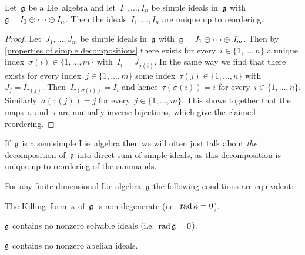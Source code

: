 \begin{corollary}
  \label{uniqueness of semisimple decomposition}
  Let~$\mathfrak{g}$ be a Lie~algebra and let~$I_1, \dotsc, I_n$ be simple ideals in~$\mathfrak{g}$ with~$\mathfrak{g} = I_1 \oplus \dotsb \oplus I_n$.
  Then the ideals~$I_1, \dotsc, I_n$ are unique up to reordering.
\end{corollary}


\begin{proof}
  Let~$J_1, \dotsc, J_m$ be simple ideals in~$\mathfrak{g}$ with~$\mathfrak{g} = J_1 \oplus \dotsb \oplus J_m$.
  Then by \cref{properties of simple decompositions} there exists for every~$i \in \{1, \dotsc, n\}$ a unique index~$\sigma(i) \in \{1, \dotsc, m\}$ with~$I_i = J_{\sigma(i)}$.
  In the same way we find that there exists for every index~$j \in \{1, \dotsc, m\}$ some index~$\tau(j) \in \{1, \dotsc, n\}$ with~$J_j = I_{\tau(j)}$.
  Then~$I_{\tau(\sigma(i))} = I_i$ and hence~$\tau(\sigma(i)) = i$ for every~$i \in \{1, \dotsc, n\}$.
  Similarly~$\sigma(\tau(j)) = j$ for every~$j \in \{1, \dotsc, m\}$.
  This shows together that the maps~$\sigma$ and~$\tau$ are mutually inverse bijections, which give the claimed reordering.
\end{proof}
 
 
\begin{remark}
  If~$\mathfrak{g}$ is a semisimple Lie~algebra then we will often just talk about \emph{the} decomposition of~$\mathfrak{g}$ into  direct sum of simple ideals, as this decomposition is unique up to reordering of the summands.
\end{remark}


\begin{proposition}
  \label{characterisation of zero radical}
  For any finite dimensional Lie algebra~$\mathfrak{g}$ the following conditions are equivalent:
  \begin{equivalenceslist}
    \item
      \label{killing form is nondegenerate}
      The Killing~form~$\kappa$ of~$\mathfrak{g}$ is non-degenerate (i.e.~$\operatorname{rad} \kappa = 0$).
    \item
      \label{contains no solvable ideal}
      $\mathfrak{g}$ contains no nonzero solvable ideals (i.e.~$\operatorname{rad} \mathfrak{g} = 0$).
    \item
      \label{contains no abelian ideal}
      $\mathfrak{g}$ contains no nonzero abelian ideals.
  \end{equivalenceslist}
\end{proposition}


